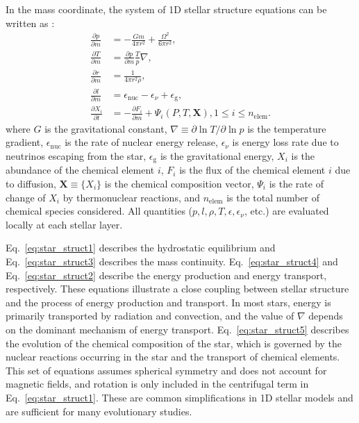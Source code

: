 \documentclass[12pt,a4paper]{article}
\newcommand{\mr}{\mathrm}
\newcommand{\pfird}[2][]{\frac{\partial#1}{\partial#2}}
\newcommand{\bvec}[1]{\boldsymbol{#1}}
\begin{document}
In the mass coordinate, the system of 1D stellar structure equations can be written as \parencite[See, for example, ][]{KippenhahnEtAl2013}:
\begin{subequations}\label{eq:star_struct}
  \begin{align}
    \pfird[p]{m} &= -\frac{G m}{4\pi r^2} + \frac{\Omega^2}{6 \pi r^2}, \label{eq:star_struct1}\\
    \pfird[T]{m} &= \pfird[p]{m} \frac{T}{p} \nabla, \label{eq:star_struct2}\\
    \pfird[r]{m} &= \frac{1}{4 \pi r^2 \rho}, \label{eq:star_struct3}\\
    \pfird[l]{m} &= \epsilon_\mr{nuc}  - \epsilon_\nu + \epsilon_\mr{g} , \label{eq:star_struct4}\\
    \pfird[X_i]{t} &= -\pfird[F_i]{m} + \Psi_i(P, T, \bvec{X}), 1\leq i \leq n_\mr{elem}. \label{eq:star_struct5}
  \end{align}
\end{subequations}
where $G$ is the gravitational constant, $\nabla \equiv \partial \ln T/\partial \ln p$ is the temperature gradient, $\epsilon_\mr{nuc}$ is the rate of nuclear energy release, $\epsilon_\nu$ is energy loss rate due to neutrinos escaping from the star, $\epsilon_\mr{g}$ is the gravitational energy, $X_i$ is the abundance of the chemical element $i$, $F_i$ is the flux of the chemical element $i$ due to diffusion, $\bvec{X} \equiv \{X_i\}$ is the chemical composition vector, $\Psi_i$ is the rate of change of $X_i$ by thermonuclear reactions, and $n_\mr{elem}$ is the total number of chemical species considered. All quantities ($p, l, \rho, T, \epsilon, \epsilon_\nu$, etc.) are evaluated locally at each stellar layer.

Eq.~\eqref{eq:star_struct1} describes the hydrostatic equilibrium and Eq.~\eqref{eq:star_struct3} describes the mass continuity. Eq.~\eqref{eq:star_struct4} and Eq.~\eqref{eq:star_struct2} describe the energy production and energy transport, respectively. These equations illustrate a close coupling between stellar structure and the process of energy production and transport. In most stars, energy is primarily transported by radiation and convection, and the value of $\nabla$ depends on the dominant mechanism of energy transport. Eq.~\eqref{eq:star_struct5} describes the evolution of the chemical composition of the star, which is governed by the nuclear reactions occurring in the star and the transport of chemical elements. This set of equations assumes spherical symmetry and does not account for magnetic fields, and rotation is only included in the centrifugal term in Eq.~\eqref{eq:star_struct1}. These are common simplifications in 1D stellar models and are sufficient for many evolutionary studies.
\end{document}
